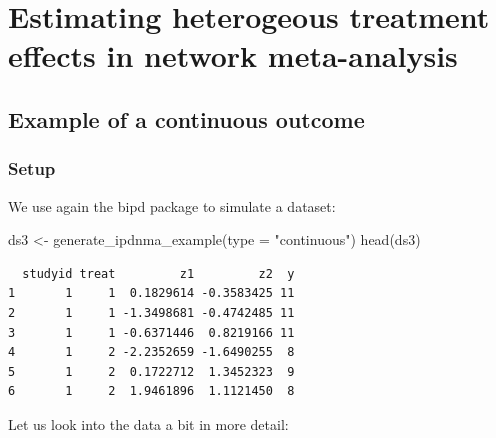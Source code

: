 \documentclass[
  letterpaper,
  DIV=11,
  numbers=noendperiod]{scrreprt}
\newenvironment{Shaded}{\begin{snugshade}}{\end{snugshade}}
\newcommand{\AttributeTok}[1]{\textcolor[rgb]{0.40,0.45,0.13}{#1}}
\newcommand{\FunctionTok}[1]{\textcolor[rgb]{0.28,0.35,0.67}{#1}}
\newcommand{\NormalTok}[1]{\textcolor[rgb]{0.00,0.23,0.31}{#1}}
\newcommand{\OtherTok}[1]{\textcolor[rgb]{0.00,0.23,0.31}{#1}}
\newcommand{\StringTok}[1]{\textcolor[rgb]{0.13,0.47,0.30}{#1}}
\begin{document}
\hypertarget{estimating-heterogeous-treatment-effects-in-network-meta-analysis}{%
\section{Estimating heterogeous treatment effects in network
meta-analysis}\label{estimating-heterogeous-treatment-effects-in-network-meta-analysis}}

\hypertarget{example-of-a-continuous-outcome-1}{%
\subsection{Example of a continuous
outcome}\label{example-of-a-continuous-outcome-1}}

\hypertarget{setup-2}{%
\subsubsection{Setup}\label{setup-2}}

We use again the bipd package to simulate a dataset:

\begin{Shaded}
\begin{Highlighting}[]
\NormalTok{ds3 }\OtherTok{\textless{}{-}} \FunctionTok{generate\_ipdnma\_example}\NormalTok{(}\AttributeTok{type =} \StringTok{"continuous"}\NormalTok{)}
\FunctionTok{head}\NormalTok{(ds3)}
\end{Highlighting}
\end{Shaded}

\begin{verbatim}
  studyid treat         z1         z2  y
1       1     1  0.1829614 -0.3583425 11
2       1     1 -1.3498681 -0.4742485 11
3       1     1 -0.6371446  0.8219166 11
4       1     2 -2.2352659 -1.6490255  8
5       1     2  0.1722712  1.3452323  9
6       1     2  1.9461896  1.1121450  8
\end{verbatim}

Let us look into the data a bit in more detail:
\end{document}
